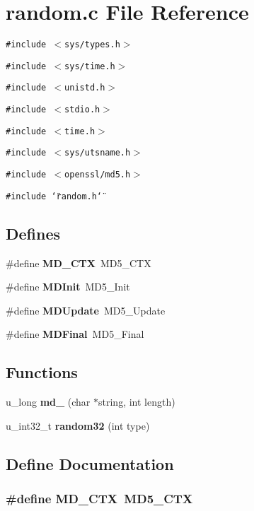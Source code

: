 \section{random.c File Reference}
\label{random_8c}
{\tt \#include $<$sys/types.h$>$}\par
{\tt \#include $<$sys/time.h$>$}\par
{\tt \#include $<$unistd.h$>$}\par
{\tt \#include $<$stdio.h$>$}\par
{\tt \#include $<$time.h$>$}\par
{\tt \#include $<$sys/utsname.h$>$}\par
{\tt \#include $<$openssl/md5.h$>$}\par
{\tt \#include \char`\"{}random.h\char`\"{}}\par
\subsection*{Defines}
\begin{CompactItemize}
\item 
\#define {\bf MD\_\-CTX}\ MD5\_\-CTX
\item 
\#define {\bf MDInit}\ MD5\_\-Init
\item 
\#define {\bf MDUpdate}\ MD5\_\-Update
\item 
\#define {\bf MDFinal}\ MD5\_\-Final
\end{CompactItemize}
\subsection*{Functions}
\begin{CompactItemize}
\item 
u\_\-long {\bf md\_} (char $\ast$string, int length)
\item 
u\_\-int32\_\-t {\bf random32} (int type)
\end{CompactItemize}


\subsection{Define Documentation}
\subsubsection{\setlength{\rightskip}{0pt plus 5cm}\#define MD\_\-CTX\ MD5\_\-CTX}\label{random_8c_a0}


